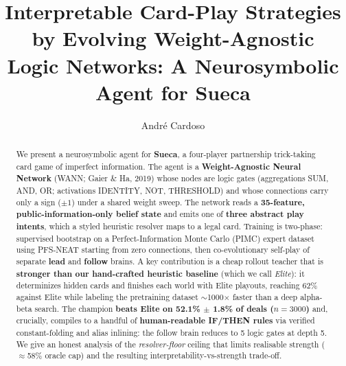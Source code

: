 \documentclass[runningheads]{llncs}
\begin{document}
\title{Interpretable Card-Play Strategies by Evolving Weight-Agnostic\\
Logic Networks: A Neurosymbolic Agent for Sueca}

\author{André Cardoso}

\maketitle

\begin{abstract}
We present a neurosymbolic agent for \textbf{Sueca}, a four-player partnership
trick-taking card game of imperfect information. The agent is a
\textbf{Weight-Agnostic Neural Network} (WANN; Gaier \& Ha, 2019) whose nodes
are logic gates (aggregations SUM, AND, OR; activations IDENTITY, NOT,
THRESHOLD) and whose connections carry only a sign ($\pm 1$) under a shared
weight sweep. The network reads a \textbf{35-feature, public-information-only
belief state} and emits one of \textbf{three abstract play intents}, which a
styled heuristic resolver maps to a legal card. Training is two-phase:
supervised bootstrap on a Perfect-Information Monte Carlo (PIMC) expert dataset
using PFS-NEAT starting from zero connections, then co-evolutionary self-play
of separate \textbf{lead} and \textbf{follow} brains. A key contribution is a
cheap rollout teacher that is \textbf{stronger than our hand-crafted heuristic
baseline} (which we call \emph{Elite}): it determinizes hidden cards and finishes
each world with Elite playouts, reaching 62\% against Elite while labeling the
pretraining dataset $\sim$1000$\times$ faster than a deep alpha-beta search. The champion
\textbf{beats Elite on 52.1\% $\pm$ 1.8\% of deals ($n=3000$)} and,
crucially, compiles to a handful of \textbf{human-readable IF/THEN rules} via
verified constant-folding and alias inlining: the follow brain reduces to 5
logic gates at depth 5. We give an honest analysis of the \emph{resolver-floor}
ceiling that limits realisable strength ($\approx$58\% oracle cap) and the
resulting interpretability-vs-strength trade-off.
\end{abstract}
\end{document}
